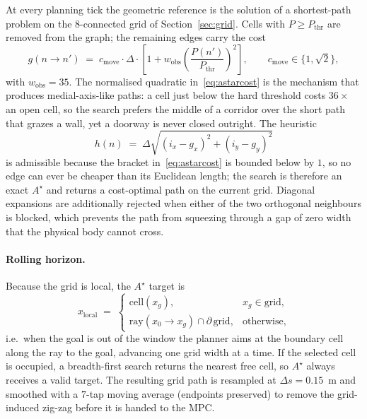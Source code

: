 \documentclass[11pt,a4paper]{article}
\newcommand{\astar}{$A^\star$}
\begin{document}
At every planning tick the geometric reference is the solution of a shortest-path problem on the
$8$-connected grid of Section~\ref{sec:grid}. Cells with $P\ge P_{\mathrm{thr}}$ are removed from the graph;
the remaining edges carry the cost
\begin{equation}
  g(n\rightarrow n') \;=\; c_{\mathrm{move}}\cdot\Delta\cdot
  \left[1+w_{\mathrm{obs}}\left(\frac{P(n')}{P_{\mathrm{thr}}}\right)^{\!2}\right],
  \qquad c_{\mathrm{move}}\in\{1,\sqrt2\},
  \label{eq:astarcost}
\end{equation}
with $w_{\mathrm{obs}}=35$. The normalised quadratic in~\eqref{eq:astarcost} is the mechanism that produces
medial-axis-like paths: a cell just below the hard threshold costs $36\times$ an open cell, so the search
prefers the middle of a corridor over the short path that grazes a wall, yet a doorway is never closed
outright. The heuristic
\begin{equation}
  h(n) \;=\; \Delta\sqrt{(i_x-g_x)^2+(i_y-g_y)^2}
  \label{eq:astarh}
\end{equation}
is admissible because the bracket in~\eqref{eq:astarcost} is bounded below by $1$, so no edge can ever be
cheaper than its Euclidean length; the search is therefore an exact \astar{} and returns a cost-optimal path
on the current grid. Diagonal expansions are additionally rejected when either of the two orthogonal
neighbours is blocked, which prevents the path from squeezing through a gap of zero width that the physical
body cannot cross.

\paragraph{Rolling horizon.} Because the grid is local, the \astar{} target is
\begin{equation}
  x_{\mathrm{local}} \;=\;
  \begin{cases}
    \mathrm{cell}(x_g), & x_g\in\mathrm{grid},\\[2pt]
    \mathrm{ray}(x_0\!\rightarrow\! x_g)\cap\partial\,\mathrm{grid}, & \text{otherwise},
  \end{cases}
  \label{eq:localgoal}
\end{equation}
i.e.\ when the goal is out of the window the planner aims at the boundary cell along the ray to the goal,
advancing one grid width at a time. If the selected cell is occupied, a breadth-first search returns the
nearest free cell, so \astar{} always receives a valid target. The resulting grid path is resampled at
$\Delta s=0.15$~m and smoothed with a $7$-tap moving average (endpoints preserved) to remove the
grid-induced zig-zag before it is handed to the MPC.
\end{document}
